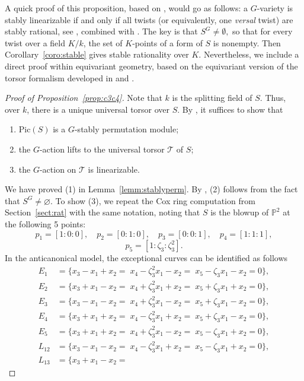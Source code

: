 \documentclass[12pt, reqno]{amsart}
\theoremstyle{plain}
\theoremstyle{remark}
\theoremstyle{definition}
\numberwithin{equation}{section}
\def\cT{{\mathcal T}}
\def\bP{{\mathbb P}}
\def\Pic{\mathrm{Pic}}
\begin{document}
A quick proof of this proposition, based on \cite{DR}, would go as follows: 
a $G$-variety is stably linearizable if and only if all twists (or equivalently, one {\em versal} twist) are stably rational, see \cite[Theorem 1.1]{DR}, combined with \cite[Theorem 2.5]{KT-notions}. The key is that 
$
S^G\neq \emptyset,
$
so that for every twist over a field $K/k$, the set of $K$-points of a form of $S$ is nonempty. Then Corollary~\ref{coro:stable} gives stable rationality over $K$. Nevertheless, we include a  direct proof within equivariant geometry, based on the equivariant version of the torsor formalism developed in \cite{HT-torsor} and \cite{KT-uni}.
\begin{proof}[Proof of Proposition~\ref{prop:c3c4}]
  Note that $k$ is the splitting field of $S$. Thus, over $k$, there is a unique universal torsor over $S$. 
By \cite[Corollary 9]{HT-torsor}, it suffices to show that \begin{enumerate}
 \item $\Pic(S)$ is a $G$-stably permutation module;
        \item the $G$-action lifts to the universal torsor $\cT$ of $S$;
        \item the $G$-action on $\cT$ is linearizable. 
    \end{enumerate}
   We have proved (1) in Lemma~\ref{lemm:stablyperm}. 
By \cite{HT-torsor}, (2) follows from the fact that $S^G\ne\varnothing$. To show (3), we repeat the Cox ring computation from Section~\ref{sect:rat} with the same notation, noting that $S$ is the blowup of $\bP^2$ at the following 5 points:
$$
p_1=[1:0:0],\quad p_2=[0:1:0],\quad p_3=[0:0:1], \quad 
p_4=[1:1:1],
$$
$$
p_5=[1:\zeta_3:\zeta_3^2].
$$
In the anticanonical model, the exceptional curves can be identified as follows
{\begin{align*}
E_1
&= \{
x_3-x_1+x_2=\;
x_4-\zeta_3^2x_1-x_2=\;
x_5-\zeta_3 x_1-x_2
=0\},\\
E_2
&= \{
x_3+x_1-x_2=\;
x_4+\zeta_3^2x_1+x_2=\;
x_5+\zeta_3 x_1+x_2
=0\},\\
E_3
&= \{
x_3-x_1-x_2=\;
x_4+\zeta_3^2x_1-x_2=\;
x_5+\zeta_3 x_1-x_2
=0\},\\
E_4
&= \{
x_3+x_1+x_2=\;
x_4-\zeta_3^2x_1+x_2=\;
x_5+\zeta_3 x_1-x_2
=0\},\\
E_5
&= \{
x_3+x_1+x_2=\;
x_4+\zeta_3^2x_1-x_2=\;
x_5-\zeta_3 x_1+x_2
=0\},\\
L_{12}
&= \{
x_3-x_1-x_2=\;
x_4-\zeta_3^2x_1+x_2=\;
x_5-\zeta_3 x_1+x_2
=0\},\\
L_{13}
&= \{
x_3+x_1-x_2=\;

\end{align*}}
\end{proof}
\end{document}
